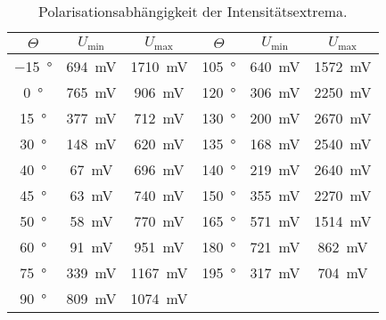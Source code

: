 \begin{table}
  \centering
  \caption{Polarisationsabhängigkeit der Intensitätsextrema.}
  \label{tabular_01}
  \begin{tabular}{c c c | c c c}
    \toprule
   \multicolumn{1}{c}{$\Theta$} & \multicolumn{1}{c}{$U_\text{min}$} & \multicolumn{1}{c}{$U_\text{max}$}
   & \multicolumn{1}{c}{$\Theta$} & \multicolumn{1}{c}{$U_\text{min}$} & \multicolumn{1}{c}{$U_\text{max}$}\\
   \midrule
   \SI{-15}{\degree} & \SI{694}{\milli\volt} & \SI{1710}{\milli\volt} & \SI{105}{\degree} & \SI{640}{\milli\volt} & \SI{1572}{\milli\volt}\\
   \SI{0  }{\degree} & \SI{765}{\milli\volt} & \SI{906 }{\milli\volt} & \SI{120}{\degree} & \SI{306}{\milli\volt} & \SI{2250}{\milli\volt}\\
   \SI{15 }{\degree} & \SI{377}{\milli\volt} & \SI{712 }{\milli\volt} & \SI{130}{\degree} & \SI{200}{\milli\volt} & \SI{2670}{\milli\volt}\\
   \SI{30 }{\degree} & \SI{148}{\milli\volt} & \SI{620 }{\milli\volt} & \SI{135}{\degree} & \SI{168}{\milli\volt} & \SI{2540}{\milli\volt}\\
   \SI{40 }{\degree} & \SI{67 }{\milli\volt} & \SI{696 }{\milli\volt} & \SI{140}{\degree} & \SI{219}{\milli\volt} & \SI{2640}{\milli\volt}\\
   \SI{45 }{\degree} & \SI{63 }{\milli\volt} & \SI{740 }{\milli\volt} & \SI{150}{\degree} & \SI{355}{\milli\volt} & \SI{2270}{\milli\volt}\\
   \SI{50 }{\degree} & \SI{58 }{\milli\volt} & \SI{770 }{\milli\volt} & \SI{165}{\degree} & \SI{571}{\milli\volt} & \SI{1514}{\milli\volt}\\
   \SI{60 }{\degree} & \SI{91 }{\milli\volt} & \SI{951 }{\milli\volt} & \SI{180}{\degree} & \SI{721}{\milli\volt} & \SI{862 }{\milli\volt}\\
   \SI{75 }{\degree} & \SI{339}{\milli\volt} & \SI{1167}{\milli\volt} & \SI{195}{\degree} & \SI{317}{\milli\volt} & \SI{704 }{\milli\volt}\\
   \SI{90 }{\degree} & \SI{809}{\milli\volt} & \SI{1074}{\milli\volt} \\
\bottomrule
  \end{tabular}
\end{table}
